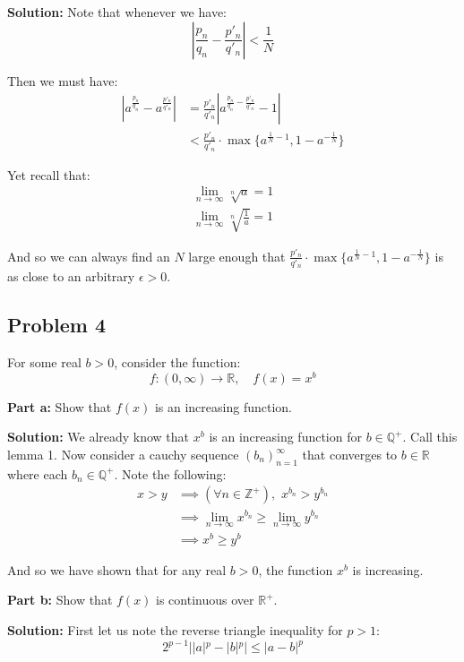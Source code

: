 \documentclass{article}
\newcommand{\R}{\mathbb R}
\newcommand{\Q}{\mathbb Q}
\newcommand{\Z}{\mathbb Z}
\begin{document}
\noindent\textbf{Solution:} Note that whenever we have:
$$\left|\frac{p_n}{q_n}-\frac{p'_n}{q'_n}\right|<\frac{1}{N}$$

Then we must have:
\begin{align*}
  \left|a^{\frac{p_n}{q_n}}-a^{\frac{p'_n}{q'_n}}\right|&=\frac{p'_n}{q'_n}\left|a^{\frac{p_n}{q_n}-\frac{p'_n}{q'_n}}-1\right|\tag{all positive}\\
  &<\frac{p'_n}{q'_n}\cdot\max\{a^{\frac{1}{N}-1},1-a^{-\frac{1}{N}}\}
\end{align*}

Yet recall that:
\begin{gather*}
  \lim_{n\to\infty}\sqrt[n]{a}=1\\
  \lim_{n\to\infty}\sqrt[n]{\frac{1}{a}}=1
\end{gather*}

And so we can always find an $N$ large enough that $\frac{p'_n}{q'_n}\cdot\max\{a^{\frac{1}{N}-1},1-a^{-\frac{1}{N}}\}$ is as close to an arbitrary $\epsilon>0$.
\bigskip

\subsection*{Problem 4}
For some real $b>0$, consider the function:
$$f:(0,\infty)\to\R,\quad f(x)=x^b$$

\noindent\textbf{Part a:} Show that $f(x)$ is an increasing function.
\bigskip

\noindent\textbf{Solution:} We already know that $x^b$ is an increasing function for $b\in\Q^+$. Call this lemma 1. Now consider a cauchy sequence $(b_n)_{n=1}^\infty$ that converges to $b\in\R$ where each $b_n\in\Q^+$. Note the following:
\begin{align*}
  x>y&\implies (\forall n\in\Z^+),\,\,x^{b_n}>y^{b_n}\tag{lemma 1}\\
  &\implies \lim_{n\to\infty}x^{b_n}\ge\lim_{n\to\infty}y^{b_n}\tag{limits exist \& respect inequalities}\\
  &\implies x^b\ge y^b\tag{problem 3}
\end{align*}

And so we have shown that for any real $b>0$, the function $x^b$ is increasing.
\bigskip

\noindent\textbf{Part b:} Show that $f(x)$ is continuous over $\R^+$. 
\bigskip

\noindent\textbf{Solution:} First let us note the reverse triangle inequality for $p>1$:
$$2^{p-1}||a|^p-|b|^p|\le|a-b|^p$$
\end{document}
